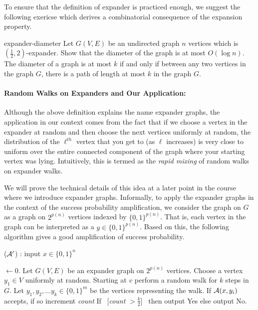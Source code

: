 To ensure that the definition of expander is practiced enough, we suggest the following exericse which derives a combinatorial consequence of the expansion property.

\begin{exercise-prob}
\begin{show-ps1}{expander-diameter}
Let $G(V,E)$ be an undirected graph $n$ vertices which is $(\frac{1}{2},2)$-expander. Show that the diameter of the graph is at most $O(\log n)$. The diameter of a graph is at most $k$ if and only if between any two vertices in the graph $G$, there is a path of length at most $k$ in the graph $G$.
\end{show-ps1}
\end{exercise-prob}


\paragraph{Random Walks on Expanders and Our Application:} Although the above definition explains the name expander graphs, the application in our context comes from the fact that if we choose a vertex in the expander at random and then choose the next vertices uniformly at random, the distribution of the $\ell^{th}$ vertex that you get to (as $\ell$ increases) is very close to uniform over the entire connected component of the graph where your starting vertex was lying. Intuitively, this is termed as the {\em rapid mixing} of random walks on expander walks.

We will prove the technical details of this idea at a later point in the course where we introduce expander graphs. Informally, to apply the expander graphs in the context of the success probability amplification, we consider the graph on $G$ as a graph on $2^{p(n)}$ vertices indexed by $\{0,1\}^{p(n)}$. That is, each vertex in the graph can be interpreted as a $y \in \{0,1\}^{p(n)}$. Based on this, the following algorithm gives a good amplification of success probability.


\begin{algorithm}
\label{alg:trivial-amplification}
\caption{(${\cal{A}'}$) : input $x \in \{0,1\}^n$} 
\begin{algorithmic}[1]
 $\gets 0$. 
\State Let $G(V,E)$ be an expander graph on $2^{p(n)}$ vertices.
\State Choose a vertex $y_1 \in V$ uniformly at random. 
\State Starting at $v$ perform a random walk for $k$ steps in $G$. Let $y_1, y_2, \ldots y_k \in \{0,1\}^m$ be the vertices representing the walk. 
	\State If ${\cal{A}}(x,y_i)$ accepts, if so increment {\em count}
\EndFor
\State If ~[{\em count} $> \frac{k}{2}$]~ then output {\sc Yes} else output {\sc No}.
\end{algorithmic}
\end{algorithm}

